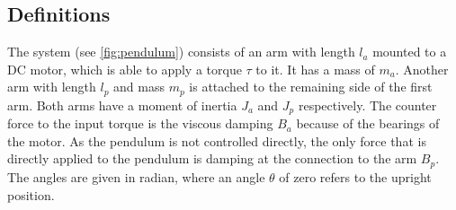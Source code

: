 \subsection{Definitions}
The system (see \ref{fig:pendulum}) consists of an arm with length $l_a$ 
mounted to a DC motor, which is 
able to apply a torque $\tau$ to it. It has a mass of $m_a$. Another arm with 
length $l_p$ and mass 
$m_p$ %
is attached to the remaining side of the 
first arm. Both arms have a moment of inertia $J_a$ and $J_p$ respectively. The 
counter force to the input torque is the viscous damping $B_a$ because of the 
bearings of the motor. As the pendulum is not controlled directly, the only 
force that is directly applied to the pendulum is damping at the connection to 
the arm $B_p$. The angles are given in radian, where an angle $\theta$ of zero 
refers to the upright position.

